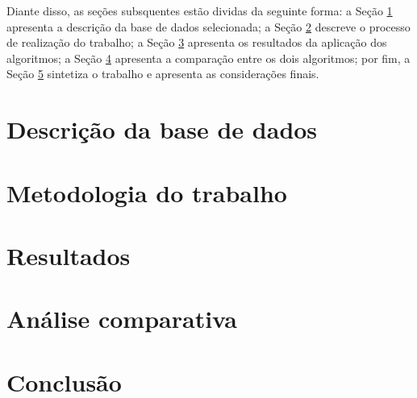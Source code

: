 \documentclass[12pt]{article}
\begin{document}
Diante disso, as seções subsquentes estão dividas da seguinte forma: a Seção \ref{sec:descricao} apresenta a descrição da base de dados selecionada; a Seção \ref{sec:metodologia} descreve o processo de realização do trabalho; a Seção \ref{sec:resultados} apresenta os resultados da aplicação dos algoritmos; a Seção \ref{sec:analise} apresenta a comparação entre os dois algoritmos; por fim, a Seção \ref{sec:conclusao} sintetiza o trabalho e apresenta as considerações finais.

\section{Descrição da base de dados}\label{sec:descricao}

\section{Metodologia do trabalho}\label{sec:metodologia}

\section{Resultados}\label{sec:resultados}

\section{Análise comparativa}\label{sec:analise}

\section{Conclusão}\label{sec:conclusao}





\end{document}
